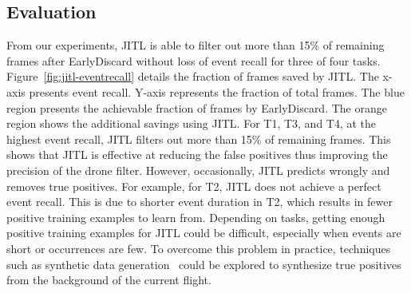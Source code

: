\subsection{Evaluation}

From our experiments, JITL is able to filter out more than 15\% of remaining
frames after EarlyDiscard without loss of event recall for three of four tasks.
Figure~\ref{fig:jitl-eventrecall} details the fraction of frames saved by JITL.
The x-axis presents event recall. Y-axis represents the fraction of total
frames. The blue region presents the achievable fraction of frames by
EarlyDiscard. The orange region shows the additional savings using JITL. For T1,
T3, and T4, at the highest event recall, JITL filters out more than 15\% of
remaining frames. This shows that JITL is effective at reducing the false
positives thus improving the precision of the drone filter. However,
occasionally, JITL predicts wrongly and removes true positives. For example, for
T2, JITL does not achieve a perfect event recall. This is due to shorter event
duration in T2, which results in fewer positive training examples to learn
from. Depending on tasks, getting enough positive training examples for JITL
could be difficult, especially when events are short or occurrences are few. To
overcome this problem in practice, techniques such as synthetic data
generation~\cite{Dwibedi2017} could be explored to synthesize true positives
from the background of the current flight.
